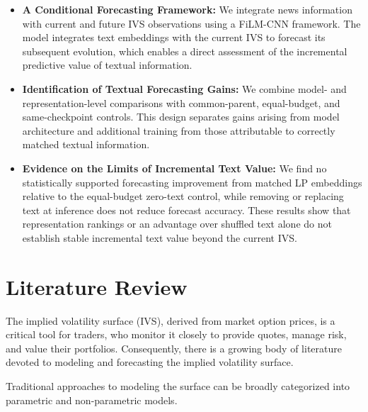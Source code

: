 \begin{itemize}
\item \textbf{A Conditional Forecasting Framework:} We integrate news information with current and future IVS observations using a FiLM-CNN framework. The model integrates text embeddings with the current IVS to forecast its subsequent evolution, which enables a direct assessment of the incremental predictive value of textual information.



\item \textbf{Identification of Textual Forecasting Gains:} We combine model- and representation-level comparisons with common-parent, equal-budget, and same-checkpoint controls. This design separates gains arising from model architecture and additional training from those attributable to correctly matched textual information.


\item \textbf{Evidence on the Limits of Incremental Text Value:} We find no statistically supported forecasting improvement from matched LP embeddings relative to the equal-budget zero-text control, while removing or replacing text at inference does not reduce forecast accuracy. These results show that representation rankings or an advantage over shuffled text alone do not establish stable incremental text value beyond the current IVS.
\end{itemize}






\section{Literature Review}\label{ch3:sec:lr}

The implied volatility surface (IVS), derived from market option prices, is a critical tool for traders, who monitor it closely to provide quotes, manage risk, and value their portfolios. Consequently, there is a growing body of literature devoted to modeling and forecasting the implied volatility surface.


Traditional approaches to modeling the surface can be broadly categorized into parametric and non-parametric models.

